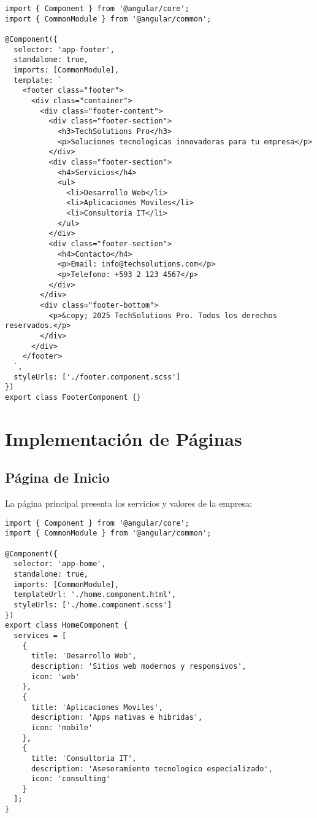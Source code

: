 \begin{lstlisting}[caption=Footer Component]
import { Component } from '@angular/core';
import { CommonModule } from '@angular/common';

@Component({
  selector: 'app-footer',
  standalone: true,
  imports: [CommonModule],
  template: `
    <footer class="footer">
      <div class="container">
        <div class="footer-content">
          <div class="footer-section">
            <h3>TechSolutions Pro</h3>
            <p>Soluciones tecnologicas innovadoras para tu empresa</p>
          </div>
          <div class="footer-section">
            <h4>Servicios</h4>
            <ul>
              <li>Desarrollo Web</li>
              <li>Aplicaciones Moviles</li>
              <li>Consultoria IT</li>
            </ul>
          </div>
          <div class="footer-section">
            <h4>Contacto</h4>
            <p>Email: info@techsolutions.com</p>
            <p>Telefono: +593 2 123 4567</p>
          </div>
        </div>
        <div class="footer-bottom">
          <p>&copy; 2025 TechSolutions Pro. Todos los derechos reservados.</p>
        </div>
      </div>
    </footer>
  `,
  styleUrls: ['./footer.component.scss']
})
export class FooterComponent {}
\end{lstlisting}

\section{Implementación de Páginas}

\subsection{Página de Inicio}

La página principal presenta los servicios y valores de la empresa:

\begin{lstlisting}[caption=Home Component]
import { Component } from '@angular/core';
import { CommonModule } from '@angular/common';

@Component({
  selector: 'app-home',
  standalone: true,
  imports: [CommonModule],
  templateUrl: './home.component.html',
  styleUrls: ['./home.component.scss']
})
export class HomeComponent {
  services = [
    {
      title: 'Desarrollo Web',
      description: 'Sitios web modernos y responsivos',
      icon: 'web'
    },
    {
      title: 'Aplicaciones Moviles',
      description: 'Apps nativas e hibridas',
      icon: 'mobile'
    },
    {
      title: 'Consultoria IT',
      description: 'Asesoramiento tecnologico especializado',
      icon: 'consulting'
    }
  ];
}
\end{lstlisting}

